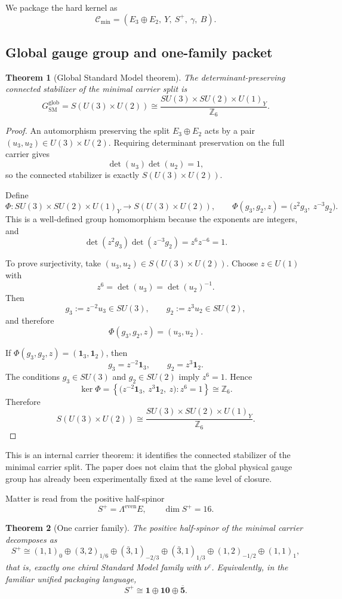 \documentclass[11pt,a4paper]{article}
\newtheorem{theorem}{Theorem}[section]
\theoremstyle{definition}
\theoremstyle{remark}
\newcommand{\SM}{\mathrm{SM}}
\newcommand{\Cmin}{\mathcal C_{\min}}
\begin{document}
We package the hard kernel as
\[
\Cmin=(E_3\oplus E_2,\ Y,\ S^+,\ \gamma,\ B).
\]

\subsection{Global gauge group and one-family packet}

\begin{theorem}[Global Standard Model theorem]
The determinant-preserving connected stabilizer of the minimal carrier split is
\[
G_{\SM}^{\mathrm{glob}}
=
S(U(3)\times U(2))
\cong
\frac{SU(3)\times SU(2)\times U(1)_Y}{\mathbb Z_6}.
\]
\end{theorem}

\begin{proof}
An automorphism preserving the split $E_3\oplus E_2$ acts by a pair
$(u_3,u_2)\in U(3)\times U(2)$. Requiring determinant preservation on the full
carrier gives
\[
\det(u_3)\det(u_2)=1,
\]
so the connected stabilizer is exactly $S(U(3)\times U(2))$.

Define
\[
\Phi:SU(3)\times SU(2)\times U(1)_Y \longrightarrow S(U(3)\times U(2)),
\qquad
\Phi(g_3,g_2,z)=\bigl(z^2 g_3,\ z^{-3} g_2\bigr).
\]
This is a well-defined group homomorphism because the exponents are integers, and
\[
\det(z^2 g_3)\det(z^{-3} g_2)=z^6 z^{-6}=1.
\]

To prove surjectivity, take $(u_3,u_2)\in S(U(3)\times U(2))$. Choose
$z\in U(1)$ with
\[
z^6=\det(u_3)=\det(u_2)^{-1}.
\]
Then
\[
g_3:=z^{-2}u_3\in SU(3),
\qquad
g_2:=z^{3}u_2\in SU(2),
\]
and therefore
\[
\Phi(g_3,g_2,z)=(u_3,u_2).
\]

If $\Phi(g_3,g_2,z)=(\mathbf 1_3,\mathbf 1_2)$, then
\[
g_3=z^{-2}\mathbf 1_3,
\qquad
g_2=z^{3}\mathbf 1_2.
\]
The conditions $g_3\in SU(3)$ and $g_2\in SU(2)$ imply $z^6=1$. Hence
\[
\ker\Phi
=
\left\{
\bigl(z^{-2}\mathbf 1_3,\ z^{3}\mathbf 1_2,\ z\bigr): z^6=1
\right\}
\cong \mathbb Z_6.
\]
Therefore
\[
S(U(3)\times U(2))
\cong
\frac{SU(3)\times SU(2)\times U(1)_Y}{\mathbb Z_6}.
\]
\end{proof}
This is an internal carrier theorem: it identifies the connected stabilizer of the minimal carrier split. The paper does not claim that the global physical gauge group has already been experimentally fixed at the same level of closure.

Matter is read from the positive half-spinor
\[
S^+=\Lambda^{\mathrm{even}}E,
\qquad
\dim S^+=16.
\]

\begin{theorem}[One carrier family]
The positive half-spinor of the minimal carrier decomposes as
\[
S^+
\cong
(1,1)_0\oplus(3,2)_{1/6}\oplus(\bar 3,1)_{-2/3}\oplus(\bar 3,1)_{1/3}\oplus(1,2)_{-1/2}\oplus(1,1)_1,
\]
that is, exactly one chiral Standard Model family with $\nu^c$. Equivalently, in the familiar unified packaging language,
\[
S^+\cong \mathbf 1\oplus \mathbf{10}\oplus \overline{\mathbf 5}.
\]
\end{theorem}
\end{document}
